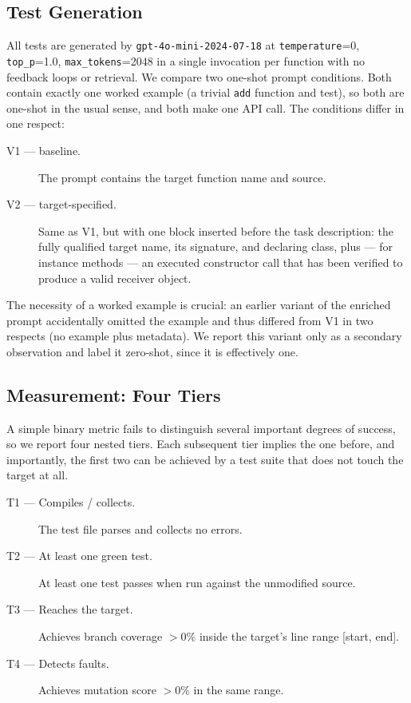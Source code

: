 \subsection{Test Generation}\label{sec:generation}

All tests are generated by \texttt{gpt-4o-mini-2024-07-18} at \texttt{temperature}=0,
\texttt{top\_p}=1.0, \texttt{max\_tokens}=2048 in a single invocation per function with no
feedback loops or retrieval. We compare two one-shot prompt conditions. Both contain exactly
one worked example (a trivial \texttt{add} function and test), so both are one-shot in the
usual sense, and both make one API call. The conditions differ in one respect:

\begin{description}
  \item[V1 --- baseline.] The prompt contains the target function name and source.
  \item[V2 --- target-specified.] Same as V1, but with one block inserted before the task
    description: the fully qualified target name, its signature, and declaring class, plus ---
    for instance methods --- an executed constructor call that has been verified to produce a
    valid receiver object.
\end{description}

The necessity of a worked example is crucial: an earlier variant of the enriched prompt
accidentally omitted the example and thus differed from V1 in two respects (no example plus
metadata). We report this variant only as a secondary observation and label it zero-shot,
since it is effectively one.

\subsection{Measurement: Four Tiers}\label{sec:tiers}

A simple binary metric fails to distinguish several important degrees of success, so we report
four nested tiers. Each subsequent tier implies the one before, and importantly, the first two
can be achieved by a test suite that does not touch the target at all.

\begin{description}
  \item[T1 --- Compiles / collects.] The test file parses and collects no errors.
  \item[T2 --- At least one green test.] At least one test passes when run against the
    unmodified source.
  \item[T3 --- Reaches the target.] Achieves branch coverage $>0\%$ inside the target's line
    range [start, end].
  \item[T4 --- Detects faults.] Achieves mutation score $>0\%$ in the same range.
\end{description}

